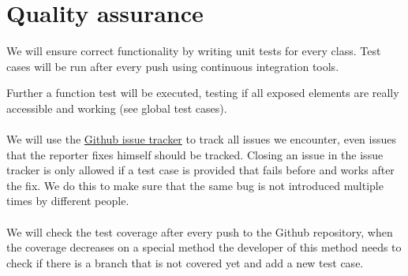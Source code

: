 \chapter{Quality assurance}
We will ensure correct functionality by writing unit tests for every class. Test cases will be run after every push using continuous integration tools.

Further a function test will be executed, testing if all exposed elements are really accessible and working (see global test cases).
\\\\
We will use the \hyperlink{https://github.com/rootjs/rootjs/issues }{Github issue tracker} to track all issues we encounter, even issues that the reporter fixes himself should be tracked.
Closing an issue in the issue tracker is only allowed if a test case is provided that fails before and works after the fix. We do this to make sure that the same bug is not introduced multiple times by different people.
\\\\
We will check the test coverage after every push to the Github repository, when the coverage decreases on a special method the developer of this method needs to check if there is a branch that is not covered yet and add a new test case.
